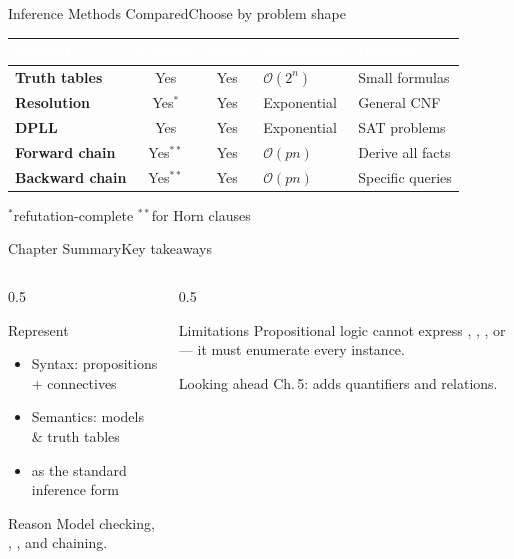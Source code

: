 \documentclass[aspectratio=169,11pt]{beamer}
\begin{document}
\begin{frame}{Inference Methods Compared}{Choose by problem shape}
  \small
  \renewcommand{\arraystretch}{1.3}
  \begin{center}
  \begin{tabularx}{\textwidth}{@{}>{\bfseries}l cc l >{\raggedright\arraybackslash}X@{}}
    \toprule
    \rowcolor{PrimaryDark}
    \textcolor{white}{Method} & \textcolor{white}{Compl.} & \textcolor{white}{Sound} &
    \textcolor{white}{Complexity} & \textcolor{white}{Best for} \\
    \midrule
    Truth tables & Yes & Yes & $\mathcal{O}(2^n)$ & Small formulas \\
    \rowcolor{PrimaryLight!25}
    Resolution & Yes$^\ast$ & Yes & Exponential & General CNF \\
    DPLL & Yes & Yes & Exponential & SAT problems \\
    \rowcolor{PrimaryLight!25}
    Forward chain & Yes$^{\ast\ast}$ & Yes & $\mathcal{O}(pn)$ & Derive all facts \\
    Backward chain & Yes$^{\ast\ast}$ & Yes & $\mathcal{O}(pn)$ & Specific queries \\
    \bottomrule
  \end{tabularx}
  \end{center}
  \centering\scriptsize $^\ast$refutation-complete \quad $^{\ast\ast}$for Horn clauses
\end{frame}

\begin{frame}{Chapter Summary}{Key takeaways}
  \begin{columns}[T]
    \begin{column}{0.5\textwidth}
      \begin{block}{Represent}
        \small
        \begin{itemize}
          \item Syntax: propositions + connectives
          \item Semantics: models \& truth tables
          \item {} as the standard inference form
        \end{itemize}
      \end{block}
      \begin{exampleblock}{Reason}
        \small Model checking, , , and chaining.
      \end{exampleblock}
    \end{column}
    \begin{column}{0.5\textwidth}
      \begin{alertblock}{Limitations}
        \small Propositional logic cannot express ,
        , , or  — it must
        enumerate every instance.
      \end{alertblock}
      \begin{block}{Looking ahead}
        \small Ch.\,5:  adds quantifiers and relations.
      \end{block}
    \end{column}
  \end{columns}
\end{frame}
\end{document}
